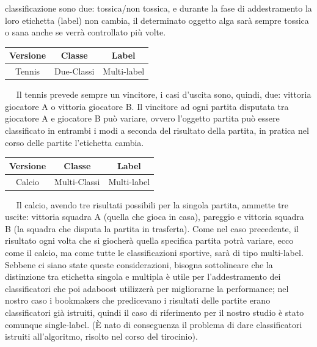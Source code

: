 classificazione sono due: tossica/non tossica, e durante la fase di addestramento 
la loro etichetta (label) non cambia, il determinato oggetto alga sar\`a sempre 
tossica o sana anche se verr\`a controllato pi\`u volte.\\
\newline
\begin{table}[!h]
\centering
\begin{tabular}{|c|c|c|}
\hline
Versione&Classe&Label\\
\hline
Tennis&Due-Classi&Multi-label\\
\hline
\end{tabular}
\end{table}
\ \
\newline
Il tennis prevede sempre un vincitore, i casi d'uscita sono, quindi, due: vittoria giocatore A o vittoria giocatore B. 
Il vincitore ad ogni partita disputata tra giocatore A e giocatore B pu\`o variare, ovvero l'oggetto partita pu\`o essere classificato in entrambi i modi a seconda del 
risultato della partita, in pratica nel corso delle partite l'etichetta cambia.\\
\newline
\begin{table}[!h]
\centering
\begin{tabular}{|c|c|c|}
\hline
Versione&Classe&Label\\
\hline
Calcio&Multi-Classi&Multi-label\\
\hline
\end{tabular}
\end{table}
\ \
\newline
Il calcio, avendo tre risultati possibili per la singola partita, ammette tre uscite: vittoria squadra A (quella 
che gioca in casa), pareggio e vittoria squadra B (la squadra che disputa la partita in trasferta). Come nel 
caso precedente, il risultato ogni volta che si giocher\`a quella specifica partita potr\`a variare, ecco come 
il calcio, ma come tutte le classificazioni sportive, sar\`a di tipo multi-label.\\
\newline
Sebbene ci siano state queste considerazioni, bisogna sottolineare che la distinzione tra etichetta singola e 
multipla \`e utile per l'addestramento dei classificatori 
che poi adaboost utilizzer\`a per 
migliorarne la performance; nel nostro caso i bookmakers che predicevano i risultati delle partite erano 
classificatori gi\`a istruiti, quindi il caso di riferimento per il nostro studio \`e stato comunque single-label. 
(\`E nato di conseguenza il problema di dare classificatori istruiti all'algoritmo, risolto nel corso del tirocinio).


